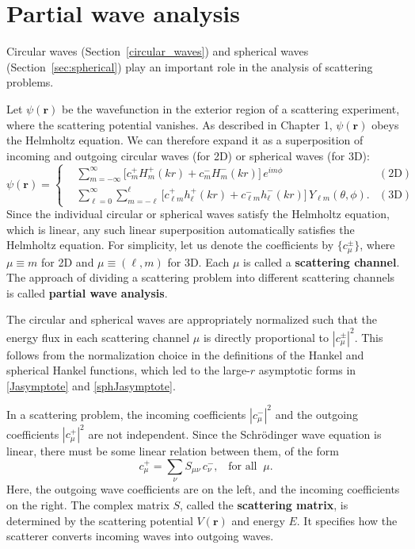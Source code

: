 \documentclass[pra,12pt]{revtex4-2}
\begin{document}
\section{Partial wave analysis}
\label{sec:scattering}

Circular waves (Section~\ref{circular_waves}) and spherical waves
(Section~\ref{sec:spherical}) play an important role in the analysis
of scattering problems.

Let $\psi(\mathbf{r})$ be the wavefunction in the exterior region of a
scattering experiment, where the scattering potential vanishes.  As
described in Chapter 1, $\psi(\mathbf{r})$ obeys the Helmholtz
equation.  We can therefore expand it as a superposition of incoming
and outgoing circular waves (for 2D) or spherical waves (for 3D):
\begin{equation}
  \psi(\mathbf{r}) =
  \left\{
  \begin{aligned}
    &\sum_{m=-\infty}^\infty
    \Big[c_m^+ H_m^+(kr) + c_m^- H_m^-(kr)\Big] \, e^{im\phi}
    & (\textrm{2D})
    \\
    &\sum_{\ell = 0}^\infty \sum_{m = - \ell}^\ell
    \Big[c_{\ell m}^+ h_\ell^+(kr) + c_{\ell m}^- h_\ell^-(kr)\Big] \,
    Y_{\ell m}(\theta, \phi). & (\textrm{3D})
  \end{aligned}\right.
  \label{psirdecomp}
\end{equation}
Since the individual circular or spherical waves satisfy the Helmholtz
equation, which is linear, any such linear superposition automatically
satisfies the Helmholtz equation.  For simplicity, let us denote the
coefficients by $\{c_\mu^\pm\}$, where $\mu \equiv m$ for 2D and $\mu
\equiv (\ell, m)$ for 3D.  Each $\mu$ is called a \textbf{scattering
  channel}.  The approach of dividing a scattering problem into
different scattering channels is called \textbf{partial wave
  analysis}.

The circular and spherical waves are appropriately normalized such
that the energy flux in each scattering channel $\mu$ is directly
proportional to $|c_\mu^\pm|^2$.  This follows from the normalization
choice in the definitions of the Hankel and spherical Hankel
functions, which led to the large-$r$ asymptotic forms in
\eqref{Jasymptote} and \eqref{sphJasymptote}.

In a scattering problem, the incoming coefficients $|c_\mu^-|^2$ and
the outgoing coefficients $|c_\mu^+|^2$ are not independent.  Since
the Schr\"odinger wave equation is linear, there must be some linear
relation between them, of the form
\begin{equation}
  c_{\mu}^+ = \sum_{\nu} S_{\mu \nu} \, c_{\nu}^-, \;\;\;\text{for all}\;\;\mu.
  \label{srelation}
\end{equation}
Here, the outgoing wave coefficients are on the left, and the incoming
coefficients on the right.  The complex matrix $S$, called the
\textbf{scattering matrix}, is determined by the scattering potential
$V(\mathbf{r})$ and energy $E$.  It specifies how the scatterer
converts incoming waves into outgoing waves.
\end{document}
